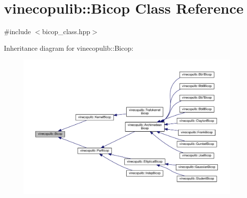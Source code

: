 \hypertarget{classvinecopulib_1_1_bicop}{}\section{vinecopulib\+:\+:Bicop Class Reference}
\label{classvinecopulib_1_1_bicop}


{\ttfamily \#include $<$bicop\+\_\+class.\+hpp$>$}



Inheritance diagram for vinecopulib\+:\+:Bicop\+:\nopagebreak
\begin{figure}[H]
\begin{center}
\leavevmode
\includegraphics[width=350pt]{classvinecopulib_1_1_bicop__inherit__graph}
\end{center}
\end{figure}
